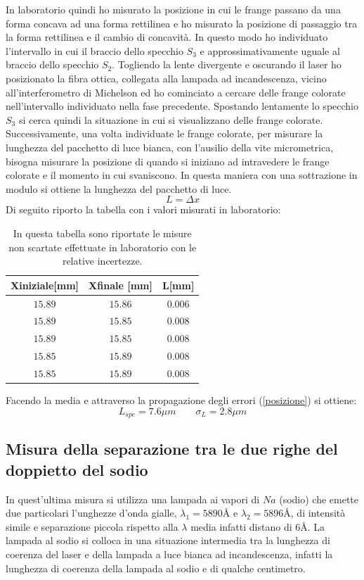 \documentclass[11pt]{article}
\begin{document}
In laboratorio quindi ho misurato la posizione in cui le frange passano da una forma concava ad una forma rettilinea e ho misurato la posizione di passaggio tra la forma rettilinea e il cambio di concavità. In questo modo ho individuato l'intervallo in cui il braccio dello specchio $S_3$ e approssimativamente uguale al braccio dello specchio $S_2$. Togliendo la lente divergente e oscurando il laser ho posizionato la fibra ottica, collegata alla lampada ad incandescenza, vicino all'interferometro di Michelson ed ho cominciato a cercare delle frange colorate nell'intervallo individuato nella fase precedente. Spostando lentamente lo specchio $S_3$ si cerca quindi la situazione in cui si visualizzano delle frange colorate. Successivamente, una volta individuate le frange colorate, per misurare la lunghezza del pacchetto di luce bianca, con l'ausilio della vite micrometrica, bisogna misurare la posizione di quando si iniziano ad intravedere le frange colorate e il momento in cui svaniscono. In questa maniera con una sottrazione in modulo si ottiene la lunghezza del pacchetto di luce.
\begin{equation}
    L=\Delta x
\end{equation}
Di seguito riporto la tabella con i valori misurati in laboratorio:
\begin{table}[H]
    \centering
    \begin{tabular}{|c|c|c|}
    \hline
     Xiniziale[mm] & Xfinale [mm] & L[mm] \\
    \hline
    $15.89$ & $15.86$ & $0.006$ \\
    \hline
    $15.89$ & $15.85$ & $0.008$ \\
    \hline
    $15.89$ & $15.85$ & $0.008$ \\
    \hline
    $15.85$ & $15.89$ & $0.008$ \\
    \hline
    $15.85$ & $15.89$ & $0.008$ \\
    \hline
    \end{tabular}
    \caption{In questa tabella sono riportate le misure non scartate effettuate in laboratorio con le relative incertezze.}
    \label{pacchetto}
\end{table}
Facendo la media e attraverso la propagazione degli errori (\ref{posizione}) si ottiene:
\begin{equation}
    \nonumber
    L_{spe}=7.6\mu m \qquad \sigma_L=2.8 \mu m
\end{equation}
\subsection{Misura della separazione tra le due righe del doppietto del sodio}
In quest'ultima misura si utilizza una lampada ai vapori di $Na$ (sodio) che emette due particolari l'unghezze d'onda gialle, $\lambda_1=5890$\r{A} e $\lambda_2=5896$\r{A}, di intensità simile e separazione piccola rispetto alla $\lambda$ media infatti distano di $6$\r{A}. La lampada al sodio si colloca in una situazione intermedia tra la lunghezza di coerenza del laser e della lampada a luce bianca ad incandescenza, infatti la lunghezza di coerenza della lampada al sodio e di qualche centimetro.
\end{document}
